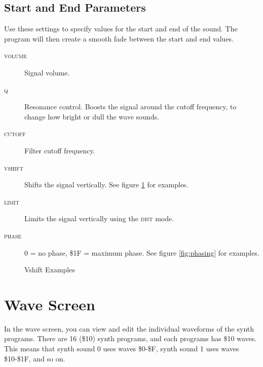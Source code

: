 \subsection{Start and End Parameters}

Use these settings to specify values for the start and end of the sound. The program will then create a smooth fade between the start and end values.

\begin{description}
\item[\textsc{volume}] Signal volume.
\item[\textsc{q}] Resonance control. Boosts the signal around the cutoff frequency, to change how bright or dull the wave sounds.
\item[\textsc{cutoff}] Filter cutoff frequency.
\item[\textsc{vshift}] Shifts the signal vertically. See figure \ref{fig:vshift} for examples.
\item[\textsc{limit}] Limits the signal vertically using the \textsc{dist} mode.
\item[\textsc{phase}] 0 = no phase, \$1F = maximum phase. See figure \ref{fig:phasing} for examples.
\end{description}

\begin{figure}[htpb]
	\centering


	\caption{Vshift Examples}
	\label{fig:vshift}
\end{figure}

\section{Wave Screen}
\label{wave-screen-section}

In the wave screen, you can view and edit the individual waveforms of the synth programs. There are 16 (\$10) synth programs, and each programs has \$10 waves. This means that synth sound 0 uses waves \$0-\$F, synth sound 1 uses waves \$10-\$1F, and so on.

